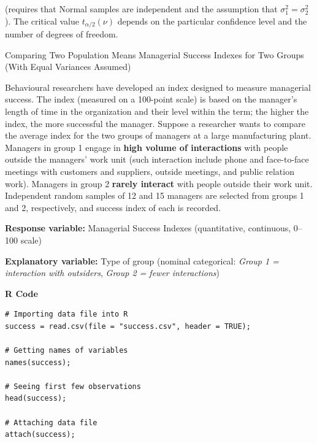 (requires that Normal samples are independent and the assumption that $\sigma_1^2 = \sigma_2^2$). The critical value $t_{\alpha/2}(\nu)$ depends on the particular confidence level and the number of degrees of freedom.
\begin{example}
Comparing Two Population Means Managerial Success Indexes for Two Groups (With Equal Variances Assumed)

Behavioural researchers have developed an index designed to measure managerial success. The index (measured on a 100-point scale) is based on the manager’s length of time in the organization and their level within the term; the higher the index, the more successful the manager. Suppose a researcher wants to compare the average index for the two groups of managers at a large manufacturing plant. Managers in group 1 engage in \textbf{high volume of interactions} with people outside the managers’ work unit (such interaction include phone and face-to-face meetings with customers and suppliers, outside meetings, and public relation work). Managers in group 2 \textbf{rarely interact} with people outside their work unit. Independent random samples of 12 and 15 managers are selected from groups 1 and 2, respectively, and success index of each is recorded.

\vspace{1em}

\textbf{Response variable:} Managerial Success Indexes (quantitative, continuous, 0–100 scale)

\textbf{Explanatory variable:} Type of group (nominal categorical: \textit{Group 1 = interaction with outsiders}, \textit{Group 2 = fewer interactions}) 

\vspace{1em}
\noindent\textbf{R Code}
\begin{tcolorbox}[colback=gray!10, colframe=black!45, arc=2mm,
  before skip=4pt, after skip=4pt]
\begin{verbatim}
# Importing data file into R
success = read.csv(file = "success.csv", header = TRUE);

# Getting names of variables
names(success);

# Seeing first few observations
head(success);

# Attaching data file
attach(success);
\end{verbatim}
\end{tcolorbox}


\end{example}
